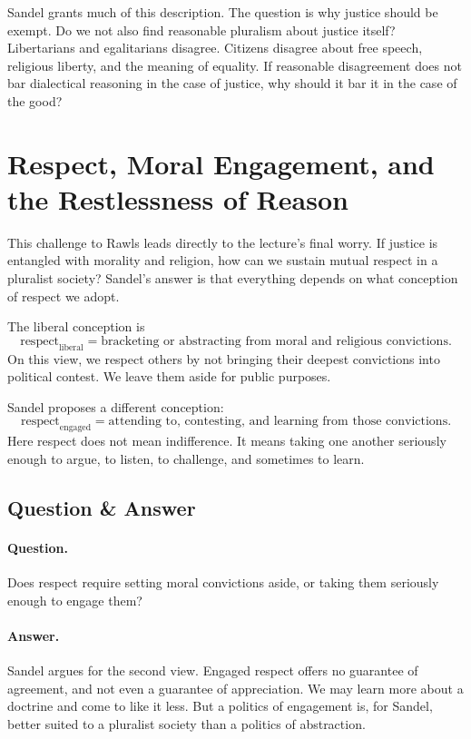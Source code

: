 Sandel grants much of this description. The question is why justice should be exempt. Do we not also find reasonable pluralism about justice itself? Libertarians and egalitarians disagree. Citizens disagree about free speech, religious liberty, and the meaning of equality. If reasonable disagreement does not bar dialectical reasoning in the case of justice, why should it bar it in the case of the good?

\section{Respect, Moral Engagement, and the Restlessness of Reason}

This challenge to Rawls leads directly to the lecture's final worry. If justice is entangled with morality and religion, how can we sustain mutual respect in a pluralist society? Sandel's answer is that everything depends on what conception of respect we adopt.

The liberal conception is
\begin{equation}
\text{respect}_{\mathrm{liberal}}
=
\text{bracketing or abstracting from moral and religious convictions}.
\end{equation}
On this view, we respect others by not bringing their deepest convictions into political contest. We leave them aside for public purposes.

Sandel proposes a different conception:
\begin{equation}
\text{respect}_{\mathrm{engaged}}
=
\text{attending to, contesting, and learning from those convictions}.
\end{equation}
Here respect does not mean indifference. It means taking one another seriously enough to argue, to listen, to challenge, and sometimes to learn.

\subsection{Question \& Answer}

\paragraph{Question.} Does respect require setting moral convictions aside, or taking them seriously enough to engage them?

\paragraph{Answer.} Sandel argues for the second view. Engaged respect offers no guarantee of agreement, and not even a guarantee of appreciation. We may learn more about a doctrine and come to like it less. But a politics of engagement is, for Sandel, better suited to a pluralist society than a politics of abstraction.

